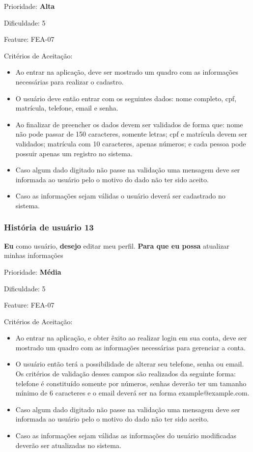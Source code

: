     Prioridade: \textbf{Alta}

    Dificuldade: 5

    Feature: FEA-07

    Critérios de Aceitação:
    \begin{itemize}
      \item Ao entrar na aplicação, deve ser mostrado um quadro com as informações necessárias para realizar o cadastro.
      \item O usuário deve então entrar com os seguintes dados: nome completo, cpf, matrícula, telefone, email e senha. 
      \item Ao finalizar de preencher os dados devem ser validados de forma que: nome não pode passar de 150 caracteres, somente letras; cpf e matrícula devem ser validados; matrícula com 10 caracteres, apenas números;  e cada pessoa pode possuir apenas um registro no sistema.
      \item Caso algum dado digitado não passe na validação uma mensagem deve ser informada ao usuário pelo o motivo do dado não ter sido aceito.
      \item Caso as informações sejam válidas o usuário deverá ser cadastrado no sistema.
    \end{itemize}

  \subsubsection{História de usuário 13}
    \textbf{Eu} como usuário, \textbf{desejo} editar meu perfil. \textbf{Para que eu possa} atualizar minhas informações

    Prioridade: \textbf{Média}

    Dificuldade: 5

    Feature: FEA-07

    Critérios de Aceitação:
    \begin{itemize}
      \item Ao entrar na aplicação, e obter êxito ao realizar login em sua conta, deve ser mostrado um quadro com as informações necessárias para gerenciar a conta.
      \item O usuário então terá a possibilidade de alterar seu telefone, senha ou email. Os critérios de validação desses campos são realizados da seguinte forma: telefone é constituído somente por números, senhas deverão ter um tamanho mínimo de 6 caracteres e o email deverá ser na forma example@example.com.
      \item Caso algum dado digitado não passe na validação uma mensagem deve ser informada ao usuário pelo o motivo do dado não ter sido aceito.
      \item Caso as informações sejam válidas as informações do usuário modificadas deverão ser atualizadas no sistema.
    \end{itemize}

